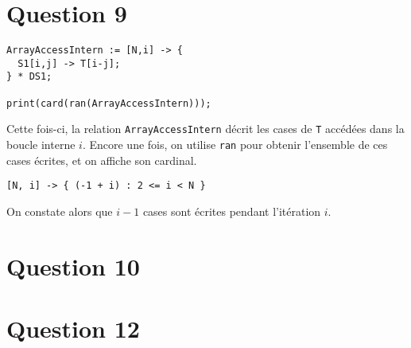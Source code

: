 \documentclass{article}
\begin{document}
\section*{Question 9}

\begin{lstlisting}
ArrayAccessIntern := [N,i] -> {
  S1[i,j] -> T[i-j];
} * DS1;

print(card(ran(ArrayAccessIntern)));
\end{lstlisting}

Cette fois-ci, la relation \lstinline{ArrayAccessIntern} décrit les cases de \lstinline{T} accédées dans la boucle interne $i$.
Encore une fois, on utilise \lstinline{ran} pour obtenir l'ensemble de ces cases écrites, et on affiche son cardinal.

\begin{lstlisting}
[N, i] -> { (-1 + i) : 2 <= i < N }
\end{lstlisting}

On constate alors que $i-1$ cases sont écrites pendant l'itération $i$.

\section*{Question 10}

\section*{Question 12}
\end{document}
